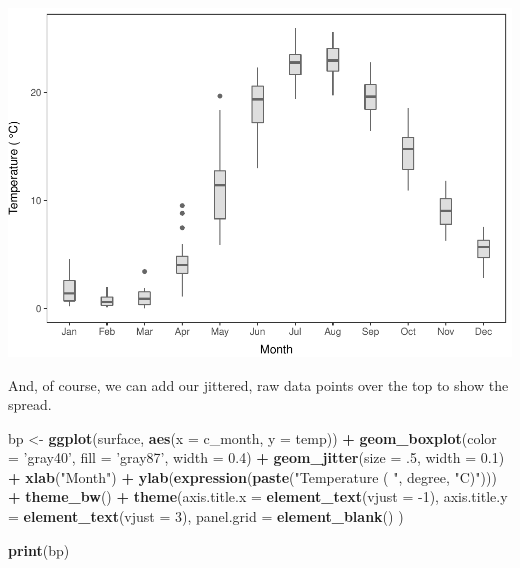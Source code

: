 \documentclass[
]{book}
\newenvironment{Shaded}{\begin{snugshade}}{\end{snugshade}}
\newcommand{\DataTypeTok}[1]{\textcolor[rgb]{0.13,0.29,0.53}{#1}}
\newcommand{\DecValTok}[1]{\textcolor[rgb]{0.00,0.00,0.81}{#1}}
\newcommand{\FloatTok}[1]{\textcolor[rgb]{0.00,0.00,0.81}{#1}}
\newcommand{\KeywordTok}[1]{\textcolor[rgb]{0.13,0.29,0.53}{\textbf{#1}}}
\newcommand{\NormalTok}[1]{#1}
\newcommand{\OperatorTok}[1]{\textcolor[rgb]{0.81,0.36,0.00}{\textbf{#1}}}
\newcommand{\StringTok}[1]{\textcolor[rgb]{0.31,0.60,0.02}{#1}}
\begin{document}
\includegraphics{worstr_files/figure-latex/unnamed-chunk-113-1.pdf}

And, of course, we can add our jittered, raw data points over the top to show the spread.

\begin{Shaded}
\begin{Highlighting}[]
\NormalTok{bp <-}\StringTok{ }\KeywordTok{ggplot}\NormalTok{(surface, }\KeywordTok{aes}\NormalTok{(}\DataTypeTok{x =}\NormalTok{ c_month, }\DataTypeTok{y =}\NormalTok{ temp)) }\OperatorTok{+}
\StringTok{  }\KeywordTok{geom_boxplot}\NormalTok{(}\DataTypeTok{color =} \StringTok{'gray40'}\NormalTok{, }\DataTypeTok{fill =} \StringTok{'gray87'}\NormalTok{, }\DataTypeTok{width =} \FloatTok{0.4}\NormalTok{) }\OperatorTok{+}
\StringTok{  }\KeywordTok{geom_jitter}\NormalTok{(}\DataTypeTok{size =} \FloatTok{.5}\NormalTok{, }\DataTypeTok{width =} \FloatTok{0.1}\NormalTok{) }\OperatorTok{+}
\StringTok{  }\KeywordTok{xlab}\NormalTok{(}\StringTok{"Month"}\NormalTok{) }\OperatorTok{+}
\StringTok{  }\KeywordTok{ylab}\NormalTok{(}\KeywordTok{expression}\NormalTok{(}\KeywordTok{paste}\NormalTok{(}\StringTok{"Temperature ( "}\NormalTok{, degree, }\StringTok{"C)"}\NormalTok{))) }\OperatorTok{+}
\StringTok{  }\KeywordTok{theme_bw}\NormalTok{() }\OperatorTok{+}
\StringTok{  }\KeywordTok{theme}\NormalTok{(}\DataTypeTok{axis.title.x =} \KeywordTok{element_text}\NormalTok{(}\DataTypeTok{vjust =} \DecValTok{-1}\NormalTok{),}
        \DataTypeTok{axis.title.y =} \KeywordTok{element_text}\NormalTok{(}\DataTypeTok{vjust =} \DecValTok{3}\NormalTok{),}
        \DataTypeTok{panel.grid =} \KeywordTok{element_blank}\NormalTok{()}
\NormalTok{  )}

\KeywordTok{print}\NormalTok{(bp)}
\end{Highlighting}
\end{Shaded}
\end{document}
